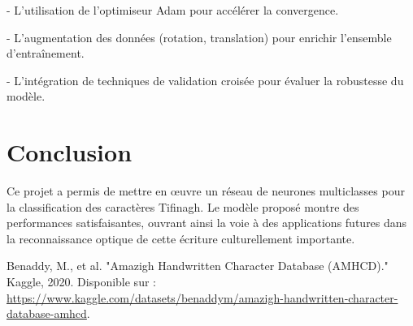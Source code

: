 \documentclass[12pt,a4paper]{article}
\begin{document}
	- L’utilisation de l’optimiseur Adam pour accélérer la convergence.
	
	- L’augmentation des données (rotation, translation) pour enrichir l’ensemble d’entraînement.
	
	- L’intégration de techniques de validation croisée pour évaluer la robustesse du modèle.
	
	
	\section{Conclusion}
	Ce projet a permis de mettre en œuvre un réseau de neurones multiclasses pour la classification des caractères Tifinagh. Le modèle proposé montre des performances satisfaisantes, ouvrant ainsi la voie à des applications futures dans la reconnaissance optique de cette écriture culturellement importante.
	

	
	\begin{thebibliography}{9}
		 Benaddy, M., et al. "Amazigh Handwritten Character Database (AMHCD)." Kaggle, 2020. Disponible sur : \url{https://www.kaggle.com/datasets/benaddym/amazigh-handwritten-character-database-amhcd}. 
	\end{thebibliography}
	
\end{document}
